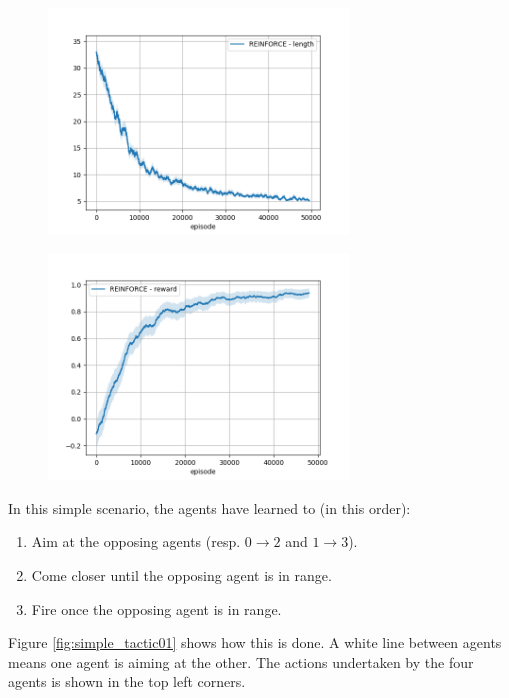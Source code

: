 \begin{figure}
\centering
\begin{minipage}{.5\textwidth}
  \centering
  \includegraphics[width=8cm]{images/experiment4/mean_length.png}
  \label{fig:exp1_length}
\end{minipage}%
\begin{minipage}{.5\textwidth}
  \centering
  \includegraphics[width=8cm]{images/experiment4/mean_reward.png}
  \label{fig:exp1_reward}
\end{minipage}
\end{figure}

In this simple scenario, the agents have learned to (in this order):
\begin{enumerate}
    \item Aim at the opposing agents (resp. $0 \rightarrow 2$ and $1 \rightarrow 3$).
    \item Come closer until the opposing agent is in range.
    \item Fire once the opposing agent is in range.
\end{enumerate}
Figure \ref{fig:simple_tactic01} shows how this is done. A white line between agents means one agent is aiming at the other. The actions undertaken by the four agents is shown in the top left corners.

